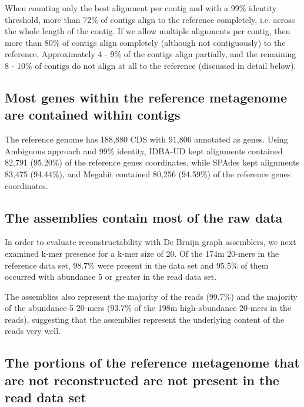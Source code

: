 \documentclass[10pt,a4paper,twocolumn]{article}
\begin{document}
When counting only the best alignment per contig and with a 99\% identity threshold, more than 72\% of contigs align to the reference completely, i.e. across the whole length of the contig.  If we allow multiple alignments per contig, then more than 80\% of contigs align completely (although not contiguously) to the reference.  Approximately 4 - 9\% of the contigs align partially, and the remaining 8 - 10\% of contigs do not align at all to the reference (discussed in detail below).


\subsection*{Most genes within the reference metagenome are contained within contigs}

The reference genome has 188,880 CDS with 91,806 annotated as genes.  
Using Ambiguous approach and 99\% identity, IDBA-UD kept alignments contained 82,791 (95.20\%) of the reference genes coordinates, while SPAdes kept alignments 83,475 (94.44\%), and Megahit contained 80,256 (94.59\%) of the reference genes coordinates. %

\subsection*{The assemblies contain most of the raw data}

In order to evaluate reconstructability with De Bruijn graph assemblers, we next examined k-mer presence for a k-mer size of 20. Of the 174m 20-mers in the reference data set, 98.7\% were present in the data set and 95.5\%  of them occurred with abundance 5 or greater in the read data set. %

The assemblies also represent the majority of the  reads (99.7\%) and the majority of the abundance-5 20-mers (93.7\% of the 198m high-abundance 20-mers in the reads), suggesting that the assemblies represent the underlying content of the reads very well. %

\subsection*{The portions of the reference metagenome that are not reconstructed are not present in the read data set}
 
\end{document}
